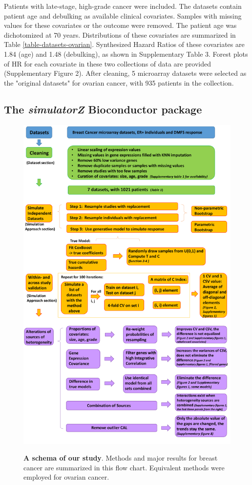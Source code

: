 \documentclass{bioinfo}
\begin{document}
  Patients with late-stage, high-grade cancer were included. 
  The datasets contain patient age and debulking as available 
  clinical covariates. Samples with missing values for these covariates or the outcome were removed. The patient age was dichotomized at 70 years. Distributions 
  of these covariates are summarized in Table \ref{table-datasets-ovarian}. Synthesized Hazard Ratios 
  of these covariates are 1.84 (age) and 1.48 (debulking), 
  as shown in Supplementary Table 3. Forest plots of HR for 
  each covariate in these two collections of data
  are provided (Supplementary Figure 2). After cleaning, 5 microarray datasets were selected as the "original datasets" for ovarian cancer, with 935 patients in the collection.
  

  \subsection{The \emph{simulatorZ} Bioconductor package}
 
 \begin{figure}[htp]
    \centering
    \includegraphics[width=12.5cm]{schema_update_new_allpanels.pdf}\\
    \caption{\textbf{A schema of our study}. Methods and major results for breast cancer are summarized in this flow chart. Equivalent methods were employed for ovarian cancer. }
    \label{scheme}
  \end{figure}
\end{document}
